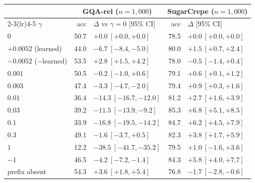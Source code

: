 \begin{tabular}{@{}l rl rl@{}}
\toprule
 & \multicolumn{2}{c}{GQA-rel ($n{=}1{,}000$)} & \multicolumn{2}{c}{SugarCrepe ($n{=}1{,}000$)} \\
\cmidrule(lr){2-3}\cmidrule(lr){4-5}
$\gamma$ & acc & $\Delta$ vs $\gamma{=}0$ [95\% CI] & acc & $\Delta$ [95\% CI] \\
\midrule
$0$ & 50.7 & $+0.0\ [+0.0, +0.0]$ & 78.5 & $+0.0\ [+0.0, +0.0]$ \\
$+0.0052$ (learned) & 44.0 & $-6.7\ [-8.4, -5.0]$ & 80.0 & $+1.5\ [+0.7, +2.4]$ \\
$-0.0052$ ($-$learned) & 53.5 & $+2.8\ [+1.5, +4.2]$ & 78.0 & $-0.5\ [-1.4, +0.4]$ \\
$0.001$ & 50.5 & $-0.2\ [-1.0, +0.6]$ & 79.1 & $+0.6\ [+0.1, +1.2]$ \\
$0.003$ & 47.4 & $-3.3\ [-4.7, -2.0]$ & 79.4 & $+0.9\ [+0.3, +1.6]$ \\
$0.01$ & 36.4 & $-14.3\ [-16.7, -12.0]$ & 81.2 & $+2.7\ [+1.6, +3.9]$ \\
$0.03$ & 39.2 & $-11.5\ [-13.9, -9.2]$ & 85.3 & $+6.8\ [+5.1, +8.5]$ \\
$0.1$ & 33.9 & $-16.8\ [-19.5, -14.2]$ & 84.7 & $+6.2\ [+4.5, +7.9]$ \\
$0.3$ & 49.1 & $-1.6\ [-3.7, +0.5]$ & 82.3 & $+3.8\ [+1.7, +5.9]$ \\
$1$ & 12.2 & $-38.5\ [-41.7, -35.2]$ & 79.5 & $+1.0\ [-1.6, +3.6]$ \\
$-1$ & 46.5 & $-4.2\ [-7.2, -1.4]$ & 84.3 & $+5.8\ [+4.0, +7.7]$ \\
\midrule
prefix absent & 54.3 & $+3.6\ [+1.8, +5.4]$ & 76.8 & $-1.7\ [-2.8, -0.6]$ \\
\bottomrule
\end{tabular}
